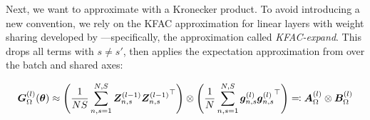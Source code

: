 Next, we want to approximate  with a Kronecker product.
To avoid introducing a new convention, we rely on the KFAC approximation for linear layers with weight sharing developed by \citet{eschenhagen2023kroneckerfactored}---specifically, the approximation called \emph{KFAC-expand}.
This drops all terms with $s\neq s'$, then applies the expectation approximation from  over the batch and shared axes:
\begin{tcolorbox}[colframe=kfac, title={KFAC for the Gauss-Newton matrix of a Laplace operator},bottom=0mm,top=-2mm,middle=0mm]
  \begin{align}\label{eq:KFAC-PINN}
    {\bm{G}}^{(l)}_\Omega({\bm{\theta}})
    \approx
    \left( \frac{1}{N S} \sum_{n,s=1}^{N,S} {\bm{Z}}^{(l-1)}_{n,s}{{\bm{Z}}^{(l-1)}_{n,s}}^\top \right )
    \otimes
    \left(
    \frac{1}{N}
    \sum_{n,s=1}^{N,S} {\bm{g}}^{(l)}_{n,s}{{\bm{g}}^{(l)}_{n,s}}^\top
    \right)
    \eqqcolon
    {\bm{A}}_{\Omega}^{(l)} \otimes {\bm{B}}_{\Omega}^{(l)}
  \end{align}
\end{tcolorbox}

